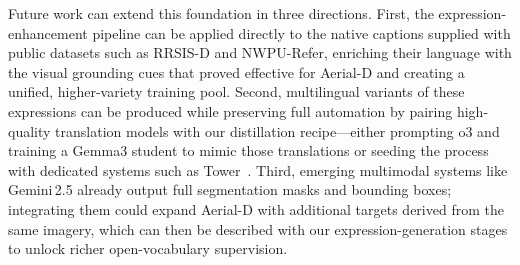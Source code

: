 \documentclass[journal]{IEEEtran}
\begin{document}
Future work can extend this foundation in three directions. First, the expression-enhancement pipeline can be applied directly to the native captions supplied with public datasets such as RRSIS-D and NWPU-Refer, enriching their language with the visual grounding cues that proved effective for Aerial-D and creating a unified, higher-variety training pool. Second, multilingual variants of these expressions can be produced while preserving full automation by pairing high-quality translation models with our distillation recipe—either prompting o3 and training a Gemma3 student to mimic those translations or seeding the process with dedicated systems such as Tower~\cite{tower}. Third, emerging multimodal systems like Gemini\,2.5\cite{gemini25} already output full segmentation masks and bounding boxes; integrating them could expand Aerial-D with additional targets derived from the same imagery, which can then be described with our expression-generation stages to unlock richer open-vocabulary supervision.



\end{document}
